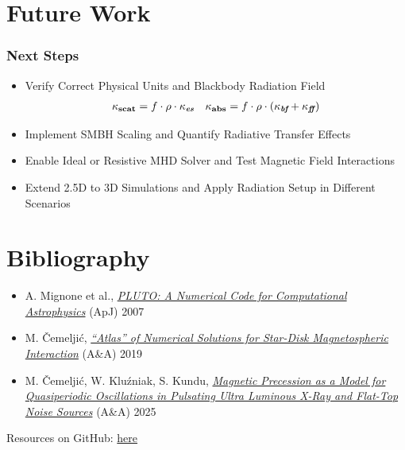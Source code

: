 	\section{Future Work}

	\begin{frame}
		\frametitle{Next Steps}
		\begin{itemize}
			\item<2-> Verify Correct Physical Units and Blackbody Radiation Field
					  \begin{align*}&&&& \kappa_\text{\bfseries{scat}} = f \cdot \rho \cdot \kappa_\text{\itshape\bfseries{es}} &&
									\kappa_\text{\bfseries{abs}} = f \cdot \rho \cdot (\kappa_\text{\itshape\bfseries{bf}} +
									\kappa_\text{\itshape\bfseries{ff}}\kern+0.5pt) &&&&\end{align*}
			\item<3-> Implement SMBH Scaling and Quantify Radiative Transfer Effects
			\item<4-> Enable Ideal or Resistive MHD Solver and Test Magnetic Field Interactions
			\item<5-> Extend 2.5D to 3D Simulations and Apply Radiation Setup in Different Scenarios
		\end{itemize}
	\end{frame}

	\section{Bibliography}

	\begin{frame}
		\begin{center}\textcolor{MASS}{}\end{center}\vspace{2ex}
		\begin{itemize}
			\item A. Mignone et al., {\itshape{\href{https://ui.adsabs.harvard.edu/abs/2007ApJS..170..228M}
													{PLUTO: A Numerical Code for Computational Astrophysics}}} (ApJ) 2007
			\item M. Čemeljić, {\itshape{\href{http://ui.adsabs.harvard.edu/abs/2019A\%26A...624A..31C}
											  {“Atlas” of Numerical Solutions for Star-Disk Magnetospheric Interaction}}} (A\&A) 2019
			\item M. Čemeljić, W. Kluźniak, S. Kundu, {\itshape{\href{https://ui.adsabs.harvard.edu/abs/2025A\%26A...703A...7C}
											  {Magnetic Precession as a Model for Quasiperiodic Oscillations in Pulsating
											   Ultra Luminous X-Ray and Flat-Top Noise Sources}}} (A\&A) 2025
		\end{itemize}
		\vspace{2ex}
		Resources on GitHub: \href{https://github.com/fritzali/notes/tree/main/CAMK/presentation/SHAMROCK}{here}
	\end{frame}

